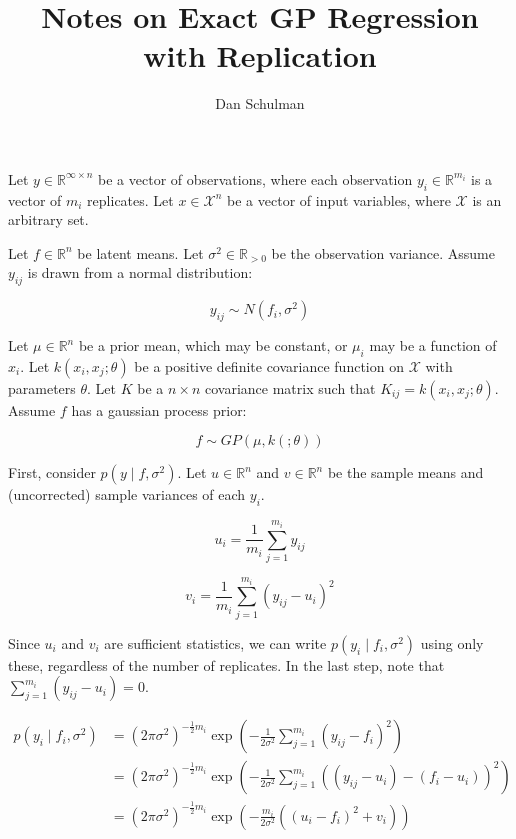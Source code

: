 \documentclass{article}
\title{Notes on Exact GP Regression with Replication}
\author{Dan Schulman}
\newcommand{\real}{\mathbb{R}}
\begin{document}
\maketitle

Let $y \in \real^{\infty \times n}$ be a vector of observations, where each observation $y_i \in \real^{m_i}$ is a vector of $m_i$ replicates.
Let $x \in \mathcal{X}^n$ be a vector of input variables, where $\mathcal{X}$ is an arbitrary set.

Let $f \in \real^n$ be latent means.
Let $\sigma^2 \in \real_{>0}$ be the observation variance.
Assume $y_{ij}$ is drawn from a normal distribution:

\begin{equation}
    y_{ij} \sim N(f_i, \sigma^2)
\end{equation}

Let $\mu \in \real^n$ be a prior mean, which may be constant, or $\mu_i$ may be a function of $x_i$.
Let $k(x_i, x_j; \theta)$ be a positive definite covariance function on $\mathcal{X}$ with parameters $\theta$.
Let $K$ be a $n \times n$ covariance matrix such that $K_{ij} = k(x_i, x_j; \theta)$.
Assume $f$ has a gaussian process prior:

\begin{equation}
    f \sim GP(\mu, k(;\theta))
\end{equation}

First, consider $p(y \mid f, \sigma^2)$.
Let $u \in \real^n$ and $v \in \real^n$ be the sample means and (uncorrected) sample variances of each $y_i$.

\begin{equation}
    u_i = \frac{1}{m_i} \sum_{j=1}^{m_i} y_{ij}
\end{equation}

\begin{equation}
    v_i = \frac{1}{m_i} \sum_{j=1}^{m_i} (y_{ij} - u_i)^2
\end{equation}

Since $u_i$ and $v_i$ are sufficient statistics, we can write $p(y_i \mid f_i, \sigma^2)$ using only these, regardless of the number of replicates.
In the last step, note that $\sum_{j=1}^{m_i} (y_{ij} - u_i) = 0$.

\begin{align}
    p(y_i \mid f_i, \sigma^2)
    &= 
    (2 \pi \sigma^2)^{-\frac{1}{2} m_i}
    \exp\left(
        -\frac{1}{2\sigma^2} 
        \sum_{j=1}^{m_i} (y_{ij} - f_i)^2
    \right)
    \\ &=
    (2 \pi \sigma^2)^{-\frac{1}{2} m_i}
    \exp\left(
        -\frac{1}{2\sigma^2} 
        \sum_{j=1}^{m_i} ((y_{ij} - u_i) - (f_i - u_i))^2
    \right)
    \\ &=
    (2 \pi \sigma^2)^{-\frac{1}{2} m_i} 
    \exp\left(
        -\frac{m_i}{2\sigma^2} \left(
            (u_i - f_i)^2 + v_i
        \right)
    \right)
\end{align}
\end{document}
